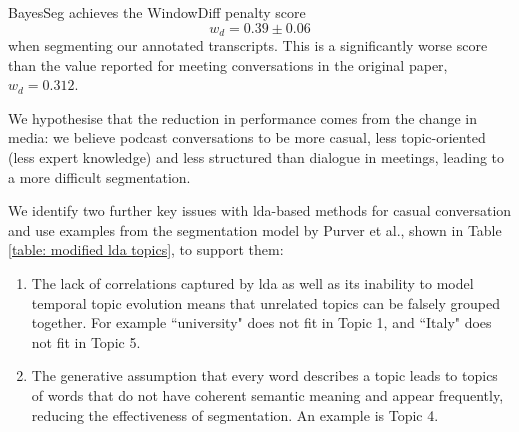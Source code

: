     BayesSeg achieves the WindowDiff penalty score
    \begin{equation}
     w_d = 0.39 \pm 0.06
    \end{equation}
    when segmenting our annotated transcripts. This is a significantly worse score than the value reported for meeting conversations in the original paper, $w_d = 0.312$\cite{eisenstein2008bayesian}.

    We hypothesise that the reduction in performance comes from the change in media: we believe podcast conversations to be more casual, less topic-oriented (less expert knowledge) and less structured than dialogue in meetings, leading to a more difficult segmentation.


      We identify two further key issues with \gls{lda}-based methods for casual conversation and use examples from the segmentation \gls{model} by Purver et al., shown in Table \ref{table: modified lda topics}, to support them:
    \begin{enumerate}
        \item The lack of correlations captured by \gls{lda} as well as its inability to \gls{model} temporal topic evolution means that unrelated topics can be falsely grouped together. For example ``university" does not fit in Topic 1, and ``Italy" does not fit in Topic 5.
        \item The generative assumption that every word describes a topic leads to topics of words that do not have coherent semantic meaning and appear frequently, reducing the effectiveness of segmentation. An example is Topic 4.
    \end{enumerate}


